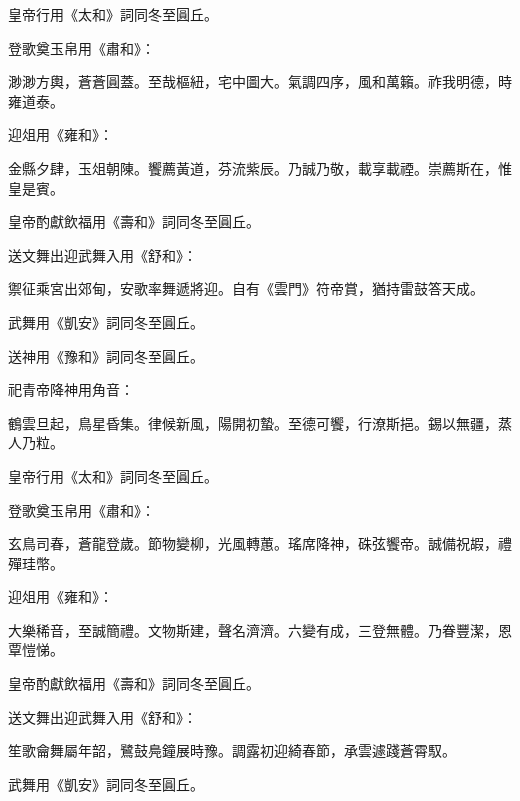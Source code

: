 \begin{pinyinscope}
 皇帝行用《太和》詞同冬至圓丘。



 登歌奠玉帛用《肅和》：



 渺渺方輿，蒼蒼圓蓋。至哉樞紐，宅中圖大。氣調四序，風和萬籟。祚我明德，時雍道泰。



 迎俎用《雍和》：



 金縣夕肆，玉俎朝陳。饗薦黃道，芬流紫辰。乃誠乃敬，載享載禋。崇薦斯在，惟皇是賓。



 皇帝酌獻飲福用《壽和》詞同冬至圓丘。



 送文舞出迎武舞入用《舒和》：



 禦征乘宮出郊甸，安歌率舞遞將迎。自有《雲門》符帝賞，猶持雷鼓答天成。



 武舞用《凱安》詞同冬至圓丘。



 送神用《豫和》詞同冬至圓丘。



 祀青帝降神用角音：



 鶴雲旦起，鳥星昏集。律候新風，陽開初蟄。至德可饗，行潦斯挹。錫以無疆，蒸人乃粒。



 皇帝行用《太和》詞同冬至圓丘。



 登歌奠玉帛用《肅和》：



 玄鳥司春，蒼龍登歲。節物變柳，光風轉蕙。瑤席降神，硃弦饗帝。誠備祝嘏，禮殫珪幣。



 迎俎用《雍和》：



 大樂稀音，至誠簡禮。文物斯建，聲名濟濟。六變有成，三登無體。乃眷豐潔，恩覃愷悌。



 皇帝酌獻飲福用《壽和》詞同冬至圓丘。



 送文舞出迎武舞入用《舒和》：



 笙歌龠舞屬年韶，鷺鼓鳧鐘展時豫。調露初迎綺春節，承雲遽踐蒼霄馭。



 武舞用《凱安》詞同冬至圓丘。




\end{pinyinscope}
